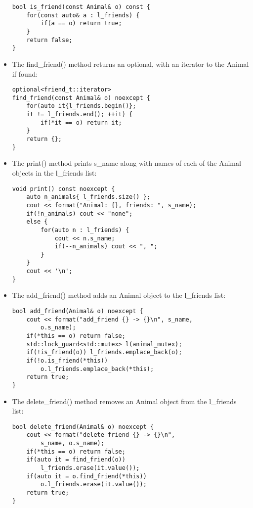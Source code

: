 \begin{itemize}
\begin{lstlisting}[style=styleCXX]
bool is_friend(const Animal& o) const {
	for(const auto& a : l_friends) {
		if(a == o) return true;
	}
	return false;
}
\end{lstlisting}

\item 
The find\_friend() method returns an optional, with an iterator to the Animal if found:

\begin{lstlisting}[style=styleCXX]
optional<friend_t::iterator>
find_friend(const Animal& o) noexcept {
	for(auto it{l_friends.begin()};
	it != l_friends.end(); ++it) {
		if(*it == o) return it;
	}
	return {};
}
\end{lstlisting}

\item 
The print() method prints s\_name along with names of each of the Animal objects in the l\_friends list:

\begin{lstlisting}[style=styleCXX]
void print() const noexcept {
	auto n_animals{ l_friends.size() };
	cout << format("Animal: {}, friends: ", s_name);
	if(!n_animals) cout << "none";
	else {
		for(auto n : l_friends) {
			cout << n.s_name;
			if(--n_animals) cout << ", ";
		}
	}
	cout << '\n';
}
\end{lstlisting}

\item 
The add\_friend() method adds an Animal object to the l\_friends list:

\begin{lstlisting}[style=styleCXX]
bool add_friend(Animal& o) noexcept {
	cout << format("add_friend {} -> {}\n", s_name,
		o.s_name);
	if(*this == o) return false;
	std::lock_guard<std::mutex> l(animal_mutex);
	if(!is_friend(o)) l_friends.emplace_back(o);
	if(!o.is_friend(*this))
		o.l_friends.emplace_back(*this);
	return true;
}
\end{lstlisting}

\item 
The delete\_friend() method removes an Animal object from the l\_friends list:

\begin{lstlisting}[style=styleCXX]
bool delete_friend(Animal& o) noexcept {
	cout << format("delete_friend {} -> {}\n",
		s_name, o.s_name);
	if(*this == o) return false;
	if(auto it = find_friend(o))
		l_friends.erase(it.value());
	if(auto it = o.find_friend(*this))
		o.l_friends.erase(it.value());
	return true;
}
\end{lstlisting}


\end{itemize}
